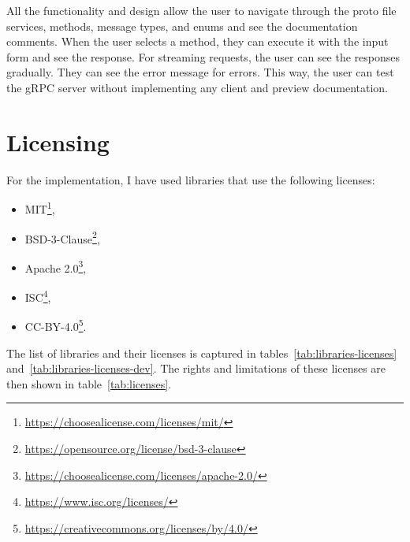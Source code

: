 All the functionality and design allow the user to navigate through the proto file services, methods, message types, and enums and see the documentation comments.
When the user selects a method, they can execute it with the input form and see the response.
For streaming requests, the user can see the responses gradually.
They can see the error message for errors.
This way, the user can test the gRPC server without implementing any client and preview documentation.


\section{Licensing}
For the implementation, I have used libraries that use the following licenses:
\begin{itemize}
    \item MIT\footnote{\url{https://choosealicense.com/licenses/mit/}},
    \item BSD-3-Clause\footnote{\url{https://opensource.org/license/bsd-3-clause}},
    \item Apache 2.0\footnote{\url{https://choosealicense.com/licenses/apache-2.0/}},
    \item ISC\footnote{\url{https://www.isc.org/licenses/}},
    \item CC-BY-4.0\footnote{\url{https://creativecommons.org/licenses/by/4.0/}}.
\end{itemize}

The list of libraries and their licenses is captured in tables~\ref{tab:libraries-licenses} and~\ref{tab:libraries-licenses-dev}.
The rights and limitations of these licenses are then shown in table~\ref{tab:licenses}.

